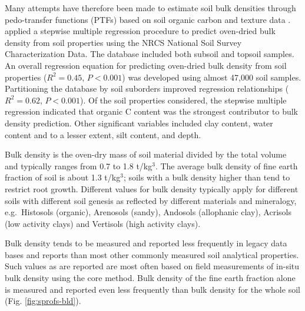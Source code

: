 \documentclass[11pt]{krantz}
\makeatletter
\newenvironment{kframe}{%
\medskip{}
\setlength{\fboxsep}{.8em}
 \def\at@end@of@kframe{}%
 \ifinner\ifhmode%
  \def\at@end@of@kframe{\end{minipage}}%
  \begin{minipage}{\columnwidth}%
 \fi\fi%
 \def\FrameCommand##1{\hskip\@totalleftmargin \hskip-\fboxsep
 \colorbox{shadecolor}{##1}\hskip-\fboxsep
     \hskip-\linewidth \hskip-\@totalleftmargin \hskip\columnwidth}%
 \MakeFramed {\advance\hsize-\width
   \@totalleftmargin\z@ \linewidth\hsize
   \@setminipage}}%
 {\par\unskip\endMakeFramed%
 \at@end@of@kframe}
\newenvironment{rmdblock}[1]
  {
  \begin{itemize}
  \renewcommand{\labelitemi}{
    \raisebox{-.7\height}[0pt][0pt]{
      {\setkeys{Gin}{width=3em,keepaspectratio}\texttt{[image: images/\#1]}}
    }
  }
  \setlength{\fboxsep}{1em}
  \begin{kframe}
  \item
  }
  {
  \end{kframe}
  \end{itemize}
  }
\newenvironment{rmdnote}
  {\begin{rmdblock}{note}}
  {\end{rmdblock}}
\theoremstyle{definition}
\theoremstyle{definition}
\theoremstyle{definition}
\theoremstyle{remark}
\makeatother
\begin{document}
Many attempts have therefore been made to estimate soil bulk densities
through pedo-transfer functions (PTFs) based on soil organic carbon and
texture data
\citep{Curtis1964SSSAP, Adams1973JSS, Alexander1980SSSAJ, Federer1993CJFR, Rawls1983SS, Manrique1991SSSAJ, Bernoux1998SSSAJ}.
\citet{Heuscher2005SSSAJ} applied a stepwise multiple regression
procedure to predict oven-dried bulk density from soil properties using
the NRCS National Soil Survey Characterization Data. The database
included both subsoil and topsoil samples. An overall regression
equation for predicting oven-dried bulk density from soil properties
(\(R^2=0.45\), \(P<0.001\)) was developed using almost 47,000 soil
samples. Partitioning the database by soil suborders improved regression
relationships (\(R^2=0.62\), \(P<0.001\)). Of the soil properties
considered, the stepwise multiple regression indicated that organic C
content was the strongest contributor to bulk density prediction. Other
significant variables included clay content, water content and to a
lesser extent, silt content, and depth.

\begin{rmdnote}
Bulk density is the oven-dry mass of soil material divided by the total
volume and typically ranges from 0.7 to 1.8 t/kg\(^3\). The average bulk
density of fine earth fraction of soil is about 1.3 t/kg\(^3\); soils
with a bulk density higher than tend to restrict root growth. Different
values for bulk density typically apply for different soils with
different soil genesis as reflected by different materials and
mineralogy, e.g.~Histosols (organic), Arenosols (sandy), Andosols
(allophanic clay), Acrisols (low activity clays) and Vertisols (high
activity clays).
\end{rmdnote}

Bulk density tends to be measured and reported less frequently in legacy
data bases and reports than most other commonly measured soil analytical
properties. Such values as are reported are most often based on field
measurements of in-situ bulk density using the core method. Bulk density
of the fine earth fraction alone is measured and reported even less
frequently than bulk density for the whole soil (Fig.
\ref{fig:sprofs-bld}).
\end{document}
